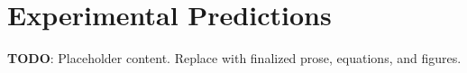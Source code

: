 
\section{Experimental Predictions}
\label{sec:experimental-predictions}

\textbf{TODO}: Placeholder content. Replace with finalized prose, equations, and figures.

